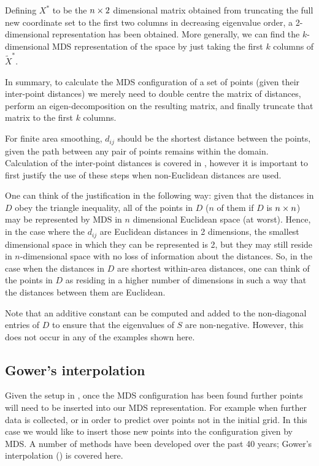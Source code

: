 Defining $X^*$ to be the $n \times 2$ dimensional matrix obtained from truncating the full new coordinate set to the first two columns in decreasing eigenvalue order, a 2-dimensional representation has been obtained. More generally, we can find the $k$-dimensional MDS representation of the space by just taking the first $k$ columns of $\tilde{X}^*$.

In summary, to calculate the MDS configuration of a set of points (given their inter-point distances) we merely need to double centre the matrix of distances, perform an eigen-decomposition on the resulting matrix, and finally truncate that matrix to the first $k$ columns.

For finite area smoothing, $d_{ij}$ should be the shortest distance between the points, given the path between any pair of points remains within the domain. Calculation of the inter-point distances is covered in , however it is important to first justify the use of these steps when non-Euclidean distances are used. 

One can think of the justification in the following way: given that the distances in $D$ obey the triangle inequality, all of the points in $D$ ($n$ of them if $D$ is $n \times n$) may be represented by MDS in $n$ dimensional Euclidean space (at worst). Hence, in the case where the $d_{ij}$ are Euclidean distances in 2 dimensions, the smallest dimensional space in which they can be represented is 2, but they may still reside in $n$-dimensional space with no loss of information about the distances. So, in the case when the distances in $D$ are shortest within-area distances, one can think of the points in $D$ as residing in a higher number of dimensions in such a way that the distances between them are Euclidean.

Note that an additive constant can be computed and added to the non-diagonal entries of $D$ to ensure that the eigenvalues of $S$ are non-negative. However, this does not occur in any of the examples shown here.

\subsection{Gower's interpolation} 
\label{gowers}
Given the setup in , once the MDS configuration has been found further points will need to be inserted into our MDS representation. For example when further data is collected, or in order to predict over points not in the initial grid. In this case we would like to insert those new points into the configuration given by MDS. A number of methods have been developed over the past 40 years; Gower's interpolation (\cite{gower1968}) is covered here.

